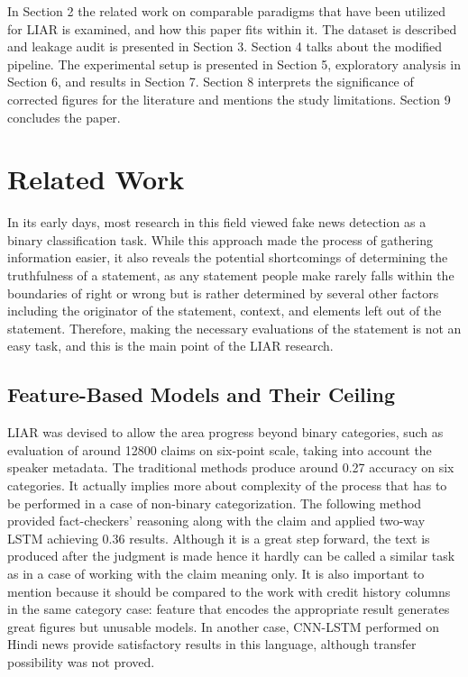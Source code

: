 \documentclass[10pt,twocolumn,twoside,a4paper]{article}
\begin{document}
In Section 2 the related work on comparable paradigms that have been utilized for LIAR is examined, and how this paper fits within it. The dataset is described and leakage audit is presented in Section 3. Section 4 talks about the modified pipeline. The experimental setup is presented in Section 5, exploratory analysis in Section 6, and results in Section 7. Section 8 interprets the significance of corrected figures for the literature and mentions the study limitations. Section 9 concludes the paper.

\section{Related Work}

In its early days, most research in this field viewed fake news detection as a binary classification task. While this approach made the process of gathering information easier, it also reveals the potential shortcomings of determining the truthfulness of a statement, as any statement people make rarely falls within the boundaries of right or wrong but is rather determined by several other factors including the originator of the statement, context, and elements left out of the statement. Therefore, making the necessary evaluations of the statement is not an easy task, and this is the main point of the LIAR research.

\subsection{Feature-Based Models and Their Ceiling}

LIAR was devised to allow the area progress beyond binary categories, such as evaluation of around 12800 claims on six-point scale, taking into account the speaker metadata. The traditional methods produce around 0.27 accuracy on six categories. It actually implies more about complexity of the process that has to be performed in a case of non-binary categorization. The following method provided fact-checkers' reasoning along with the claim and applied two-way LSTM achieving 0.36 results. Although it is a great step forward, the text is produced after the judgment is made hence it hardly can be called a similar task as in a case of working with the claim meaning only. It is also important to mention because it should be compared to the work with credit history columns in the same category case: feature that encodes the appropriate result generates great figures but unusable models. In another case, CNN-LSTM performed on Hindi news provide satisfactory results in this language, although transfer possibility was not proved.
\end{document}
